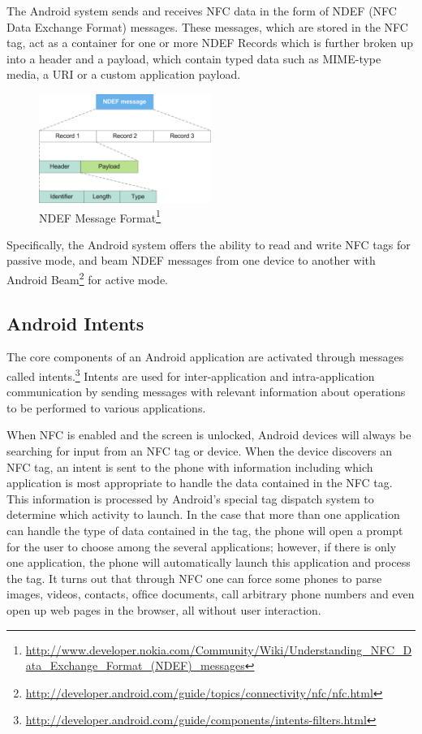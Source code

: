 \documentclass[12pt]{article}
\begin{document}
The Android system sends and receives NFC data in the form of NDEF (NFC Data Exchange Format) messages. These messages, which are stored in the NFC tag, act as a container for one or more NDEF Records which is further broken up into a header and a payload, which contain typed data such as MIME-type media, a URI or a custom application payload.

\begin{figure}[h!]
\begin{minipage}{\textwidth}
	\centering
		\includegraphics[width=0.5\textwidth]{NDEF_Format.png}
	\caption[Caption for LOF]%
		{NDEF Message Format\footnote{\url{http://www.developer.nokia.com/Community/Wiki/Understanding_NFC_Data_Exchange_Format_(NDEF)_messages}}}

\end{minipage} 
\end{figure}

Specifically, the Android system offers the ability to read and write NFC tags for passive mode, and beam NDEF messages from one device to another with Android Beam\footnote{\url{http://developer.android.com/guide/topics/connectivity/nfc/nfc.html}} for active mode. 

\subsection{Android Intents}
The core components of an Android application are activated through messages called intents.\footnote{\url{http://developer.android.com/guide/components/intents-filters.html}} Intents are used for inter-application and intra-application communication by sending messages with relevant information about operations to be performed to various applications.  

When NFC is enabled and the screen is unlocked, Android devices will always be searching for input from an NFC tag or device. When the device discovers an NFC tag, an intent is sent to the phone with information including which application is most appropriate to handle the data contained in the NFC tag. This information is processed by Android's special tag dispatch system to determine which activity to launch. In the case that more than one application can handle the type of data contained in the tag, the phone will open a prompt for the user to choose among the several applications; however, if there is only one application, the phone will automatically launch this application and process the tag. It turns out that through NFC one can force some phones to parse images, videos, contacts, ofﬁce documents, call arbitrary phone numbers and even open up web pages in the browser, all without user interaction.  
\end{document}
